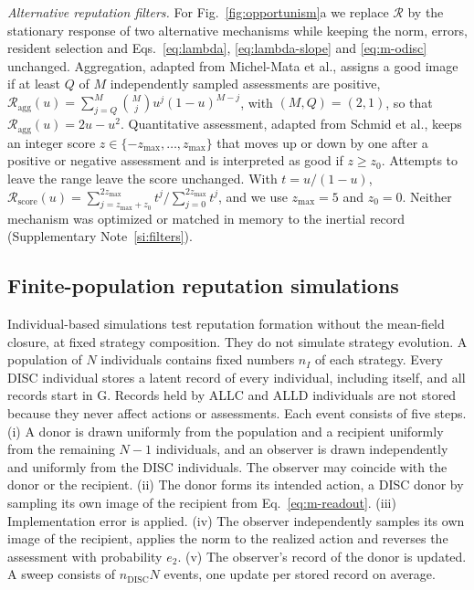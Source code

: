 \documentclass[fleqn,10pt]{wlscirep}
\newcommand{\Rmap}{\mathscr{R}}            %
\newcommand{\st}[1]{\mathrm{#1}}           %
\newcommand{\DISC}{\mathrm{DISC}}
\theoremstyle{plain}
\begin{document}
\textit{Alternative reputation filters.} For Fig.~\ref{fig:opportunism}a we replace $\Rmap$ by the stationary response of two alternative mechanisms while keeping the norm, errors, resident selection and Eqs.~\eqref{eq:lambda}, \eqref{eq:lambda-slope} and \eqref{eq:m-odisc} unchanged. Aggregation, adapted from Michel-Mata et al.\cite{michelmata2024}, assigns a good image if at least $Q$ of $M$ independently sampled assessments are positive, $\Rmap_{\mathrm{agg}}(u)=\sum_{j=Q}^{M}\binom{M}{j}u^j(1-u)^{M-j}$, with $(M,Q)=(2,1)$, so that $\Rmap_{\mathrm{agg}}(u)=2u-u^2$. Quantitative assessment, adapted from Schmid et al.\cite{schmid2023}, keeps an integer score $z\in\{-z_{\max},\ldots,z_{\max}\}$ that moves up or down by one after a positive or negative assessment and is interpreted as good if $z\geq z_0$. Attempts to leave the range leave the score unchanged. With $t=u/(1-u)$, $\Rmap_{\mathrm{score}}(u)=\sum_{j=z_{\max}+z_0}^{2z_{\max}}t^j\big/\sum_{j=0}^{2z_{\max}}t^j$, and we use $z_{\max}=5$ and $z_0=0$. Neither mechanism was optimized or matched in memory to the inertial record (Supplementary Note~\ref{si:filters}).

\subsection*{Finite-population reputation simulations}

Individual-based simulations test reputation formation without the mean-field closure, at fixed strategy composition. They do not simulate strategy evolution. A population of $N$ individuals contains fixed numbers $n_I$ of each strategy. Every DISC individual stores a latent record of every individual, including itself, and all records start in $\st G$. Records held by ALLC and ALLD individuals are not stored because they never affect actions or assessments. Each event consists of five steps. (i) A donor is drawn uniformly from the population and a recipient uniformly from the remaining $N-1$ individuals, and an observer is drawn independently and uniformly from the DISC individuals. The observer may coincide with the donor or the recipient. (ii) The donor forms its intended action, a DISC donor by sampling its own image of the recipient from Eq.~\eqref{eq:m-readout}. (iii) Implementation error is applied. (iv) The observer independently samples its own image of the recipient, applies the norm to the realized action and reverses the assessment with probability $e_2$. (v) The observer's record of the donor is updated. A sweep consists of $n_{\DISC}N$ events, one update per stored record on average.
\end{document}
